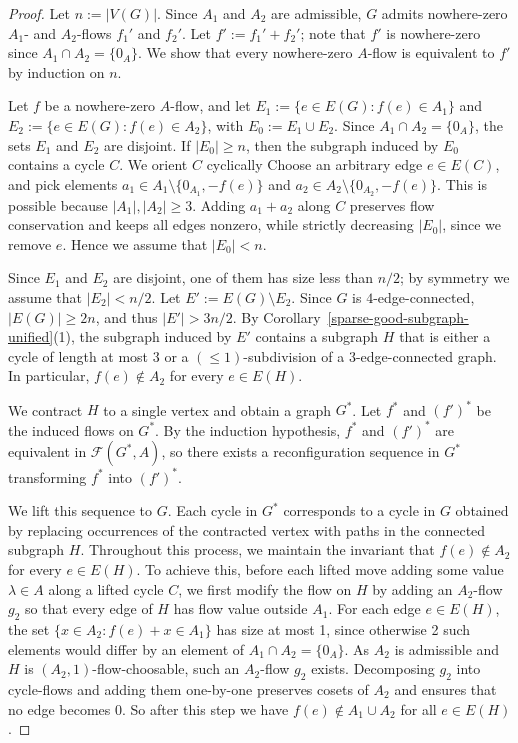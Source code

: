 \documentclass[a4paper,12pt]{article}
\theoremstyle{plain}
\theoremstyle{definition}
\renewcommand\le\leqslant
\renewcommand\ge\geqslant
\begin{document}
\begin{proof}
Let $n:=|V(G)|$. Since $A_1$ and $A_2$ are admissible, $G$ admits nowhere-zero $A_1$- and $A_2$-flows $f_1'$ and $f_2'$. Let $f':=f_1'+f_2'$; note that $f'$ is nowhere-zero since $A_1\cap A_2=\{0_A\}$. We show that every nowhere-zero $A$-flow is equivalent to $f'$ by induction on $n$.

Let $f$ be a nowhere-zero $A$-flow, and let $E_1:=\{e\in E(G): f(e)\in A_1\}$ and $E_2:=\{e\in E(G): f(e)\in A_2\}$, with $E_0:=E_1\cup E_2$. Since $A_1\cap A_2=\{0_A\}$, the sets $E_1$ and $E_2$ are disjoint. If $|E_0|\ge n$, then the subgraph induced by $E_0$ contains a cycle $C$. 
We orient $C$ cyclically 
Choose an arbitrary edge $e\in E(C)$, 
and pick elements $a_1\in A_1\setminus\{0_{A_1},-f(e)\}$ and $a_2\in A_2\setminus\{0_{A_2},-f(e)\}$. 
This is possible because $|A_1|,|A_2|\ge 3$. Adding $a_1+a_2$ along $C$ preserves flow conservation and keeps all edges nonzero, while strictly decreasing $|E_0|$, since we remove $e$. Hence we assume that $|E_0|<n$.

Since $E_1$ and $E_2$ are disjoint, one of them has size less than $n/2$; by symmetry we assume that $|E_2|<n/2$. Let $E':=E(G)\setminus E_2$. Since $G$ is $4$-edge-connected, $|E(G)|\ge 2n$, and thus $|E'|>3n/2$. By Corollary~\ref{sparse-good-subgraph-unified}(1), the subgraph induced by $E'$ contains a subgraph $H$ that is either a cycle of length at most $3$ or a $(\le 1)$-subdivision of a $3$-edge-connected graph. In particular, $f(e)\notin A_2$ for every $e\in E(H)$.

We contract $H$ to a single vertex and obtain a graph $G^*$. Let $f^*$ and $(f')^*$ be the induced flows on $G^*$. By the induction hypothesis, $f^*$ and $(f')^*$ are equivalent in $\mathcal{F}(G^*,A)$, so there exists a reconfiguration sequence in $G^*$ transforming $f^*$ into $(f')^*$.

We lift this sequence to $G$. Each cycle in $G^*$ corresponds to a cycle in $G$ obtained by replacing occurrences of the contracted vertex with paths in the connected subgraph $H$. Throughout this process, we maintain the invariant that $f(e)\notin A_2$ for every $e\in E(H)$. To achieve this, before each lifted move adding some value $\lambda\in A$ along a lifted cycle $C$, we first modify the flow on $H$ by adding an $A_2$-flow $g_2$ so that every edge of $H$ has flow value outside $A_1$. For each edge $e\in E(H)$, the set $\{x\in A_2: f(e)+x\in A_1\}$ has size at most 1, since otherwise 2 such elements would differ by an element of $A_1\cap A_2=\{0_A\}$. As $A_2$ is admissible and $H$ is $(A_2,1)$-flow-choosable, such an $A_2$-flow $g_2$ exists. Decomposing $g_2$ into cycle-flows and adding them one-by-one preserves cosets of $A_2$ and ensures that no edge becomes 0. So after this step we have $f(e)\notin A_1\cup A_2$ for all $e\in E(H)$.


\end{proof}
\end{document}
